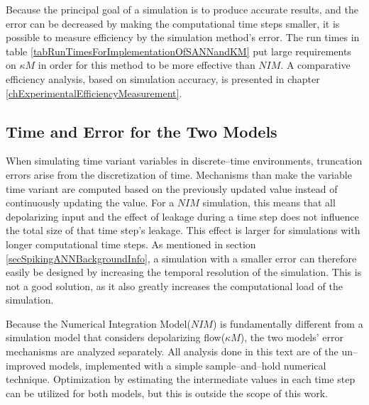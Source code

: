 		Because the principal goal of a simulation is to produce accurate results, and the error can be decreased by making the computational time steps smaller, 
			it is possible to measure efficiency by the simulation method's error\cite{PlesserStraubeMorrisonPlesser2007}.
		The run times in table \ref{tabRunTimesForImplementationOfSANNandKM} put large requirements on $\kappa M$ in order for this method to be more effective than $NIM$.
		A comparative efficiency analysis, based on simulation accuracy, is presented in chapter \ref{chExperimentalEfficiencyMeasurement}.






	

	\subsection{Time and Error for the Two Models}
	 	\label{ssecAnalysisOfErrorsForTheTwoModels}
	
        When simulating time variant variables in discrete--time environments, truncation errors arise from the discretization of time.
		Mechanisms than make the variable time variant are computed based on the previously updated value instead of continuously updating the  value.
		For a $NIM$ simulation, this means that all depolarizing input and the effect of leakage during a time step does not influence the total size of that time step's leakage.
		This effect is larger for simulations with longer computational time steps.
		As mentioned in section \ref{secSpikingANNBackgroundInfo}, a simulation with a smaller error can therefore easily be designed by increasing the temporal resolution of the simulation.
		This is not a good solution, as it also greatly increases the computational load of the simulation. 

        Because the Numerical Integration Model($NIM$) is fundamentally different from a simulation model that considers depolarizing flow($\kappa M$),
			the two models' error mechanisms are analyzed separately.
        All analysis done in this text are of the un--improved models, implemented with a simple sample--and--hold numerical technique.
        Optimization by estimating the intermediate values in each time step can be utilized for both models, but this is outside the scope of this work.



